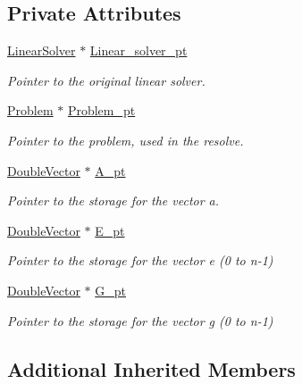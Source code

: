 \subsection*{Private Attributes}
\begin{DoxyCompactItemize}
\item 
\hyperlink{classoomph_1_1LinearSolver}{Linear\+Solver} $\ast$ \hyperlink{classoomph_1_1BlockHopfLinearSolver_a2526b2121ee73c372a4f3880e174f731}{Linear\+\_\+solver\+\_\+pt}
\begin{DoxyCompactList}\small\item\em Pointer to the original linear solver. \end{DoxyCompactList}\item 
\hyperlink{classoomph_1_1Problem}{Problem} $\ast$ \hyperlink{classoomph_1_1BlockHopfLinearSolver_a669990e3fce8c84545e112c4f5f3ffd0}{Problem\+\_\+pt}
\begin{DoxyCompactList}\small\item\em Pointer to the problem, used in the resolve. \end{DoxyCompactList}\item 
\hyperlink{classoomph_1_1DoubleVector}{Double\+Vector} $\ast$ \hyperlink{classoomph_1_1BlockHopfLinearSolver_a431b373890e0a97bf46d3f601e4df64d}{A\+\_\+pt}
\begin{DoxyCompactList}\small\item\em Pointer to the storage for the vector a. \end{DoxyCompactList}\item 
\hyperlink{classoomph_1_1DoubleVector}{Double\+Vector} $\ast$ \hyperlink{classoomph_1_1BlockHopfLinearSolver_a9f3aabed3c101b9a9a9fb1cdce4bbbbf}{E\+\_\+pt}
\begin{DoxyCompactList}\small\item\em Pointer to the storage for the vector e (0 to n-\/1) \end{DoxyCompactList}\item 
\hyperlink{classoomph_1_1DoubleVector}{Double\+Vector} $\ast$ \hyperlink{classoomph_1_1BlockHopfLinearSolver_ad6a5a8e115e10632da3815aeaff6c1d0}{G\+\_\+pt}
\begin{DoxyCompactList}\small\item\em Pointer to the storage for the vector g (0 to n-\/1) \end{DoxyCompactList}\end{DoxyCompactItemize}
\subsection*{Additional Inherited Members}


